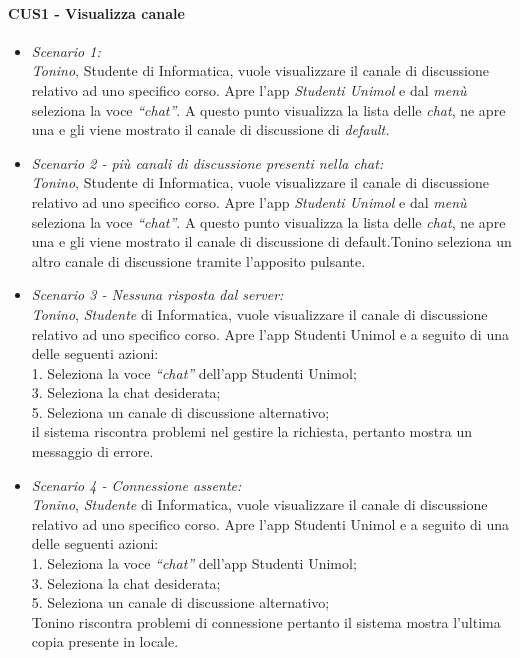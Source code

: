 \paragraph{CUS1 - Visualizza canale}
\begin{itemize}
	
	\item \textit{Scenario 1:\\}
	\textit{Tonino}, Studente di Informatica, vuole visualizzare il canale di discussione relativo ad uno specifico corso. Apre l’app \emph{Studenti Unimol} e dal \textit{menù} seleziona la voce \textit{“chat”}. A questo punto visualizza la lista delle \textit{chat}, ne apre una e gli viene mostrato il canale di discussione di \textit{default.\\}
	
	\item \textit{Scenario 2 - più canali di discussione presenti nella chat:\\}
	\textit{Tonino}, Studente di Informatica, vuole visualizzare il canale di discussione relativo ad uno specifico corso. Apre l’app \textit{Studenti Unimol} e dal \textit{menù} seleziona la voce \textit{“chat”}. A questo punto visualizza la lista delle \textit{chat}, ne apre una e gli viene mostrato il canale di discussione di default.Tonino seleziona un altro canale di discussione tramite l’apposito pulsante.\\
	
	\item \textit{Scenario 3 - Nessuna risposta dal server:\\}
	\textit{Tonino}, \textit{Studente} di Informatica, vuole visualizzare il canale di discussione relativo ad uno specifico corso. Apre l’app Studenti Unimol e a seguito di una delle seguenti azioni:\\
	1. Seleziona la voce \textit{“chat”} dell’app Studenti Unimol;\\
	3. Seleziona la chat desiderata;\\
	5. Seleziona un canale di discussione alternativo;\\
	il sistema riscontra problemi nel gestire la richiesta, pertanto mostra un messaggio di errore.\\
	
	\item \textit{Scenario 4 - Connessione assente:\\}
	\textit{Tonino}, \textit{Studente} di Informatica, vuole visualizzare il canale di discussione relativo ad uno specifico corso. Apre l’app Studenti Unimol e a seguito di una delle seguenti azioni:\\
	1. Seleziona la  voce \textit{“chat”} dell’app Studenti Unimol;\\
	3. Seleziona la chat desiderata;\\
	5. Seleziona un canale di discussione alternativo;\\
	Tonino riscontra problemi di connessione pertanto il sistema mostra l’ultima copia presente in locale.\\
	

\end{itemize}
